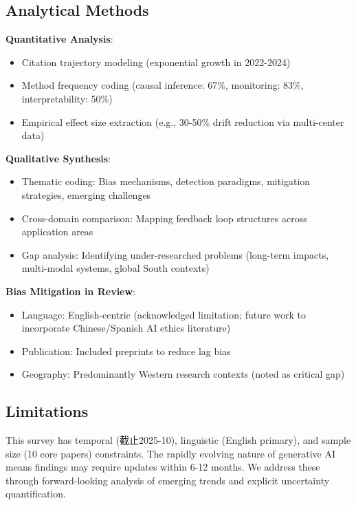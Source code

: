 \documentclass[11pt,a4paper]{article}
\begin{document}
\subsection{Analytical Methods}

\textbf{Quantitative Analysis}:  
\begin{itemize}
    \item Citation trajectory modeling (exponential growth in 2022-2024)  
    \item Method frequency coding (causal inference: 67\%, monitoring: 83\%, interpretability: 50\%)  
    \item Empirical effect size extraction (e.g., 30-50\% drift reduction via multi-center data)
\end{itemize}

\textbf{Qualitative Synthesis}:  
\begin{itemize}
    \item Thematic coding: Bias mechanisms, detection paradigms, mitigation strategies, emerging challenges  
    \item Cross-domain comparison: Mapping feedback loop structures across application areas  
    \item Gap analysis: Identifying under-researched problems (long-term impacts, multi-modal systems, global South contexts)
\end{itemize}

\textbf{Bias Mitigation in Review}:  
\begin{itemize}
    \item Language: English-centric (acknowledged limitation; future work to incorporate Chinese/Spanish AI ethics literature)  
    \item Publication: Included preprints to reduce lag bias  
    \item Geography: Predominantly Western research contexts (noted as critical gap)
\end{itemize}

\subsection{Limitations}

This survey has temporal (截止2025-10), linguistic (English primary), and sample size (10 core papers) constraints. The rapidly evolving nature of generative AI means findings may require updates within 6-12 months. We address these through forward-looking analysis of emerging trends and explicit uncertainty quantification.
\end{document}
